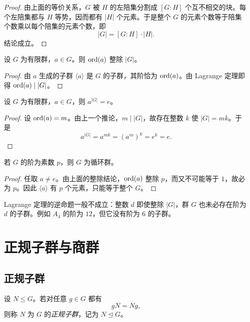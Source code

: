 \begin{proof}
由上面的等价关系，$G$ 被 $H$ 的左陪集分割成 $[G:H]$ 个互不相交的块。每个左陪集都与 $H$ 等势，因而都有 $|H|$ 个元素。于是整个 $G$ 的元素个数等于陪集个数乘以每个陪集的元素个数，即
\[
 |G|=[G:H]\cdot |H|.
\]
结论成立。
\end{proof}

\begin{corollary}
设 $G$ 为有限群，$a\in G$。则 $\mathrm{ord}(a)$ 整除 $|G|$。
\end{corollary}

\begin{proof}
由 $a$ 生成的子群 $\langle a \rangle$ 是 $G$ 的子群，其阶恰为 $\mathrm{ord}(a)$。由 Lagrange 定理即得 $\mathrm{ord}(a)\mid |G|$。
\end{proof}

\begin{corollary}
设 $G$ 为有限群，$a\in G$，则 $a^{|G|}=e$。
\end{corollary}

\begin{proof}
设 $\mathrm{ord}(a)=m$。由上一个推论，$m\mid |G|$，故存在整数 $k$ 使 $|G|=mk$。于是
\[
 a^{|G|}=a^{mk}=(a^m)^k=e^k=e.
\]
\end{proof}

\begin{corollary}
若 $G$ 的阶为素数 $p$，则 $G$ 为循环群。
\end{corollary}

\begin{proof}
任取 $a\ne e$。由上面的整除结论，$\mathrm{ord}(a)$ 整除 $p$，而又不可能等于 $1$，故必为 $p$。因此 $\langle a \rangle$ 有 $p$ 个元素，只能等于整个 $G$。
\end{proof}

\begin{remark}
Lagrange 定理的逆命题一般不成立：整数 $d$ 即使整除 $|G|$，群 $G$ 也未必存在阶为 $d$ 的子群。例如 $A_4$ 的阶为 $12$，但它没有阶为 $6$ 的子群。
\end{remark}

\section{正规子群与商群}

\subsection*{正规子群}

\begin{definition}
设 $N\le G$。若对任意 $g\in G$ 都有
\[
 gN=Ng,
\]
则称 $N$ 为 $G$ 的\emph{正规子群}，记为 $N\trianglelefteq G$。
\end{definition}


